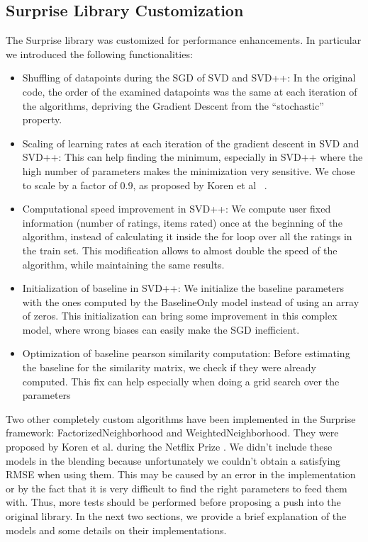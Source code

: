 \documentclass[10pt,conference,compsocconf]{IEEEtran}
\begin{document}
\subsection{Surprise Library Customization}
The Surprise library was customized for performance enhancements. In particular we introduced the following functionalities:
\begin{itemize}
\item Shuffling of datapoints during the SGD of SVD and SVD++: In the original code, the order of the examined datapoints was the same at each iteration of the algorithms, depriving the Gradient Descent from the ``stochastic'' property.
\item Scaling of learning rates at each iteration of the gradient descent in SVD and SVD++: This can help finding the minimum, especially in SVD++ where the high number of parameters makes the minimization very sensitive. We chose to scale by a factor of $0.9$, as proposed by Koren et al ~\cite{koren2009bellkor}.
\item Computational speed improvement in SVD++: We compute user fixed information (number of ratings, items rated) once at the beginning of the algorithm, instead of calculating it inside the for loop over all the ratings in the train set. This modification allows to almost double the speed of the algorithm, while maintaining the same results.
\item Initialization of baseline in SVD++: We initialize the baseline parameters with the ones computed by the BaselineOnly model instead of using an array of zeros. This initialization can bring some improvement in this complex model, where wrong biases can easily make the SGD inefficient.
\item Optimization of baseline pearson similarity computation: Before estimating the baseline for the similarity matrix, we check if they were already computed. This fix can help especially when doing a grid search over the parameters
\end{itemize}
Two other completely custom algorithms have been implemented in the Surprise framework: FactorizedNeighborhood and WeightedNeighborhood. They were proposed by Koren et al. during the Netflix Prize \cite{koren2008factorization, koren2010factor}. We didn't include these models in the blending because unfortunately we couldn't obtain a satisfying RMSE when using them. This may be caused by an error in the implementation or by the fact that it is very difficult to find the right parameters to feed them with. Thus, more tests should be performed before proposing a push into the original library. In the next two sections, we provide a brief explanation of the models and some details on their implementations.
\end{document}
